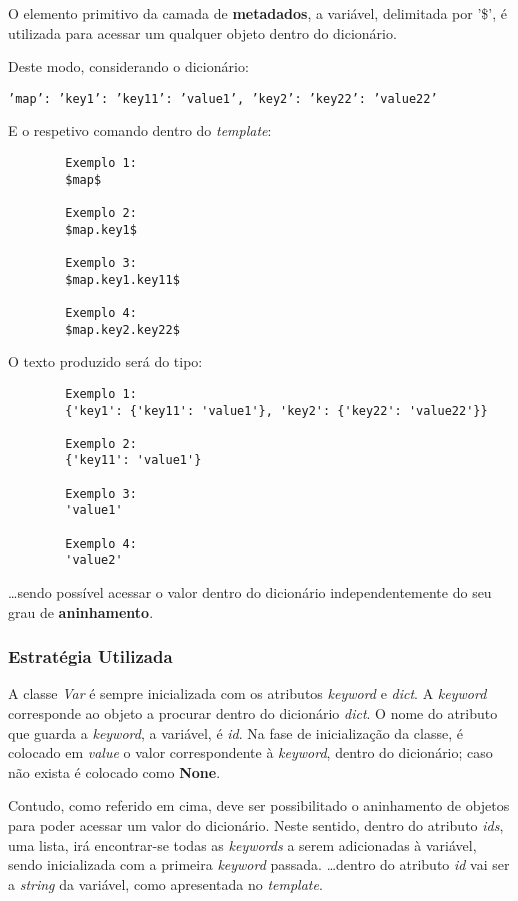 \documentclass[../relatorio.tex]{subfiles}
\begin{document}
    O elemento primitivo da camada de \textbf{metadados},
    a variável, delimitada por '\$', é utilizada para 
    acessar um qualquer objeto dentro do dicionário.

    Deste modo, considerando o dicionário:
    
    \texttt{'map': {'key1': {'key11': 'value1'}, 'key2': {'key22': 'value22'}}}

    E o respetivo comando dentro do \textit{template}:
    \begin{verbatim}
        Exemplo 1:
        $map$

        Exemplo 2:
        $map.key1$

        Exemplo 3:
        $map.key1.key11$

        Exemplo 4:
        $map.key2.key22$
    \end{verbatim}

    O texto produzido será do tipo: 

    \begin{verbatim}
        Exemplo 1:
        {'key1': {'key11': 'value1'}, 'key2': {'key22': 'value22'}}

        Exemplo 2:
        {'key11': 'value1'}

        Exemplo 3:
        'value1'

        Exemplo 4:
        'value2'
    \end{verbatim}

    \dots sendo possível acessar o valor dentro do dicionário
    independentemente do seu grau de \textbf{aninhamento}.

    \subsubsection{Estratégia Utilizada}
    A classe \textit{Var} é sempre inicializada com os atributos \textit{keyword} e
    \textit{dict}.
    A \textit{keyword} corresponde ao objeto a procurar dentro do dicionário \textit{dict}.
    O nome do atributo que guarda a \textit{keyword}, a variável, é \textit{id}.
    Na fase de inicialização da classe, é colocado em \textit{value} o valor correspondente 
    à \textit{keyword}, dentro do dicionário; caso não exista é colocado como \textbf{None}.

    Contudo, como referido em cima, deve ser possibilitado o aninhamento de objetos para poder 
    acessar um valor do dicionário.
    Neste sentido, dentro do atributo \textit{ids}, uma lista, irá encontrar-se todas 
    as \textit{keywords} a serem adicionadas à variável, sendo inicializada com a primeira
    \textit{keyword} passada.
    \dots dentro do atributo \textit{id} vai ser a \textit{string} da variável, como 
    apresentada no \textit{template}.
\end{document}
